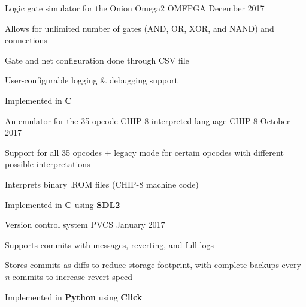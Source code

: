 

\begin{cventries}
    \cventry
    {Logic gate simulator for the Onion Omega2} %
    {OMFPGA} %
    {}{December 2017}{
        \begin{cvitems} %
            \item {Allows for unlimited number of gates (AND, OR, XOR, and NAND) and connections}
            \item {Gate and net configuration done through CSV file}
            \item {User-configurable logging \& debugging support}
            \item {Implemented in \textbf{C}}
        \end{cvitems}
    }

    \cventry
    {An emulator for the 35 opcode CHIP-8 interpreted language} %
    {CHIP-8} %
    {}{October 2017}{
        \begin{cvitems} %
            \item {Support for all 35 opcodes + legacy mode for certain opcodes with different possible interpretations}
            \item {Interprets binary .ROM files (CHIP-8 machine code)}
            \item {Implemented in \textbf{C} using \textbf{SDL2}}
        \end{cvitems}
    }

    \cventry
    {Version control system} %
    {PVCS} %
    {}{January 2017}{
        \begin{cvitems} %
            \item {Supports commits with messages, reverting, and full logs}
            \item {Stores commits as diffs to reduce storage footprint, with complete backups every \textit{n} commits to increase revert speed}
            \item {Implemented in \textbf{Python} using \textbf{Click}}
        \end{cvitems}
    }


\end{cventries}
